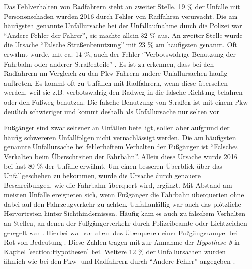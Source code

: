 Das Fehlverhalten von Radfahrern steht an zweiter Stelle. 19 \% der Unfälle mit Personenschaden wurden 2016 durch Fehler von Radfahren verursacht. Die am häufigsten genannte Unfallursache bei der Unfallaufnahme durch die Polizei war \enquote{Andere Fehler der Fahrer}, sie machte allein 32 \% aus. An zweiter Stelle wurde die Ursache \enquote{Falsche Straßenbenutzung} mit 23 \% am häufigsten genannt. Oft erwähnt wurde, mit ca. 14 \%, auch der Fehler \enquote{Verbotswidrige Benutzung der Fahrbahn oder anderer Straßenteile} \parencite[S. 274-277]{StatistischesBundesamt.2018b}. Es ist zu erkennen, dass bei den Radfahrern im Vergleich zu den Pkw-Fahrern andere Unfallursachen häufig auftreten. Es kommt oft zu Unfällen mit Radfahrern, wenn diese übersehen werden, weil sie z.B. verbotswidrig den Radweg in die falsche Richtung befahren oder den Fußweg benutzen. Die falsche Benutzung von Straßen ist mit einem Pkw deutlich schwieriger und kommt deshalb als Unfallursache nur selten vor.

Fußgänger sind zwar seltener an Unfällen beteiligt, sollen aber aufgrund der häufig schwereren Unfallfolgen nicht vernachlässigt werden. Die am häufigsten genannte Unfallursache bei fehlerhaftem Verhalten der Fußgänger ist \enquote{Falsches Verhalten beim Überschreiten der Fahrbahn}. Allein diese Ursache wurde 2016 bei fast 80 \% der Unfälle erwähnt. Um einen besseren Überblick über das Unfallgeschehen zu bekommen, wurde die Ursache durch genauere Beschreibungen, wie die Fahrbahn überquert wird, ergänzt. Mit Abstand am meisten Unfälle ereigneten sich, wenn Fußgänger die Fahrbahn überquerten ohne dabei auf den Fahrzeugverkehr zu achten. Unfallanfällig war auch das plötzliche Hervortreten hinter Sichthindernissen. Häufig kam es auch zu falschem Verhalten an Stellen, an denen der Fußgängerverkehr durch Polizeibeamte oder Lichtzeichen geregelt war \parencite[S. 304]{StatistischesBundesamt.2018b}. Hierbei war vor allem das Überqueren einer Fußgängerampel bei Rot von Bedeutung \parencite[S. 222]{Schreiber.2014}. Diese Zahlen tragen mit zur Annahme der \textit{Hypothese 8} in Kapitel \ref{section:Hypothesen} bei. Weitere 12 \% der Unfallursachen wurden ähnlich wie bei den Pkw- und Radfahrern durch \enquote{Andere Fehler} angegeben \parencite[S. 304]{StatistischesBundesamt.2018b}.

